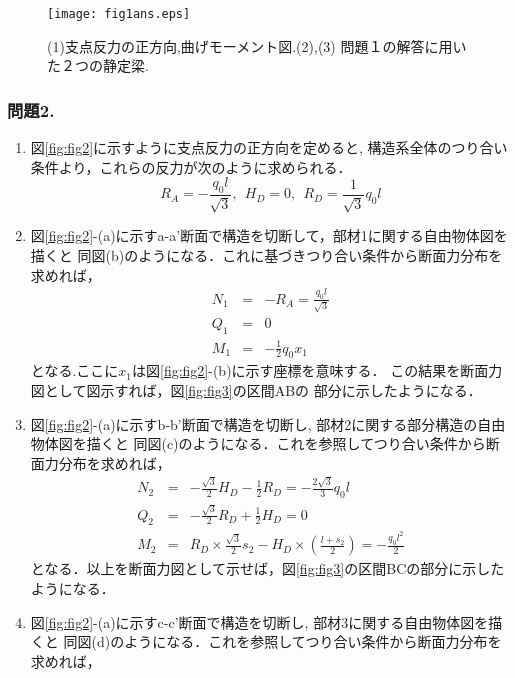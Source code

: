 ﻿\documentclass[10pt,a4j]{jarticle}
\begin{document}
\begin{figure}[h]
	\begin{center}
	\texttt{[image: fig1ans.eps]} 
	\end{center}
	\caption{(1)支点反力の正方向,曲げモーメント図.(2),(3)
	問題１の解答に用いた２つの静定梁.} 
	\label{fig:fig1}
\end{figure}
\subsubsection*{問題2.}
\begin{enumerate}
\item
図\ref{fig:fig2}に示すように支点反力の正方向を定めると,
構造系全体のつり合い条件より，これらの反力が次のように求められる．
\begin{equation}
	R_A=-\frac{q_0l}{\sqrt{3}}, \ \ 
	H_D=0, \ \ 
	R_D=\frac{1}{\sqrt{3}}q_0l
\end{equation}
\item
図\ref{fig:fig2}-(a)に示すa-a'断面で構造を切断して，部材1に関する自由物体図を描くと
同図(b)のようになる．これに基づきつり合い条件から断面力分布を求めれば，
\begin{eqnarray}
	N_1 &=&-R_A=\frac{q_0l}{\sqrt{3}} \\
	Q_1 &=& 0 \\ 
	M_1 &=&-\frac{1}{2} q_0x_1 
\end{eqnarray}
となる.ここに$x_1$は図\ref{fig:fig2}-(b)に示す座標を意味する．
この結果を断面力図として図示すれば，図\ref{fig:fig3}の区間ABの
部分に示したようになる．
\item
図\ref{fig:fig2}-(a)に示すb-b'断面で構造を切断し, 部材2に関する部分構造の自由物体図を描くと
同図(c)のようになる．これを参照してつり合い条件から断面力分布を求めれば，
\begin{eqnarray}
	N_2 &=&-\frac{\sqrt{3}}{2}H_D-\frac{1}{2}R_D=-\frac{2\sqrt{3}}{3}q_0l \\
	Q_2 &=&-\frac{\sqrt{3}}{2}R_D+\frac{1}{2}H_D = 0 \\
	M_2 &=& R_D\times \frac{\sqrt{3}}{2}s_2 -H_D\times \left(\frac{l+s_2}{2}\right)
	=-\frac{q_0l^2}{2}
\end{eqnarray}
となる．以上を断面力図として示せば，図\ref{fig:fig3}の区間BCの部分に示したようになる．
\item
図\ref{fig:fig2}-(a)に示すc-c'断面で構造を切断し, 部材3に関する自由物体図を描くと
同図(d)のようになる．これを参照してつり合い条件から断面力分布を求めれば，

\end{enumerate}
\end{document}
